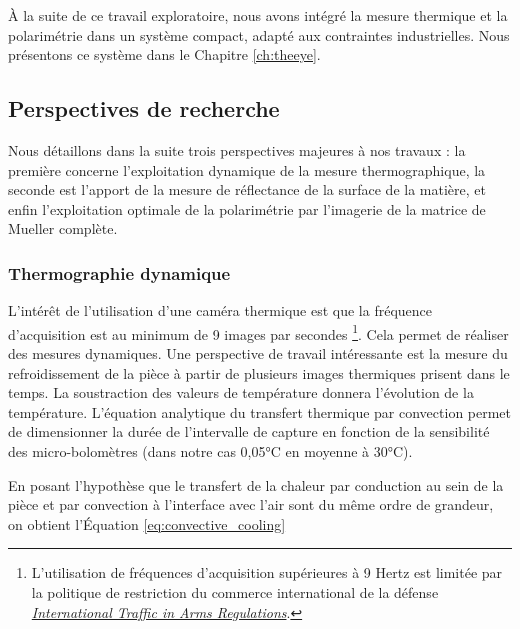 À la suite de ce travail exploratoire, nous avons intégré la mesure thermique et la polarimétrie dans un système compact, adapté aux contraintes industrielles.
Nous présentons ce système dans le Chapitre \ref{ch:theeye}.

\subsection{Perspectives de recherche}
Nous détaillons dans la suite trois perspectives majeures à nos travaux : la première concerne l'exploitation dynamique de la mesure thermographique, la seconde est l'apport de la mesure de réflectance de la surface de la matière, et enfin l'exploitation optimale de la polarimétrie par l'imagerie de la matrice de Mueller complète.

\subsubsection{Thermographie dynamique}
L'intérêt de l'utilisation d'une caméra thermique est que la fréquence d'acquisition est au minimum de 9 images par secondes \footnote{L'utilisation de fréquences d'acquisition supérieures à 9 Hertz est limitée par la politique de restriction du commerce international de la défense \textit{\href{https://fr.wikipedia.org/wiki/International_Traffic_in_Arms_Regulations}{International Traffic in Arms Regulations}}.}.
Cela permet de réaliser des mesures dynamiques.
Une perspective de travail intéressante est la mesure du refroidissement de la pièce à partir de plusieurs images thermiques prisent dans le temps.
La soustraction des valeurs de température donnera l'évolution de la température.
L'équation analytique du transfert thermique par convection permet de dimensionner la durée de l'intervalle de capture en fonction de la sensibilité des micro-bolomètres (dans notre cas 0,05°C en moyenne à 30°C).

En posant l'hypothèse que le transfert de la chaleur par conduction au sein de la pièce et par convection à l'interface avec l'air sont du même ordre de grandeur, on obtient l'Équation \ref{eq:convective_cooling}

